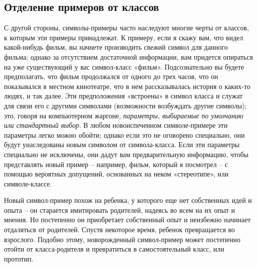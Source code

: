 \documentclass[../main.tex]{subfiles}
\begin{document}
\subsection{Отделение примеров от классов}

С другой стороны, символы-примеры часто наследуют многие черты от классов, к которым эти примеры принадлежат. К примеру, если я скажу вам, что видел какой-нибудь фильм, вы начнете производить свежий символ для данного фильма; однако за отсутствием достаточной информации, вам придется опираться на уже существующий у вас символ-класс «фильм». Подсознательно вы будете предполагать, что фильм продолжался от одного до трех часов, что он показывался в местном кинотеатре, что в нем рассказывалась история о каких-то людях, и так далее. Эти предположения «встроены» в символ класса и служат для связи его с другими символами (возможности возбуждать другие символы); это, говоря на компьютерном жаргоне, \emph{параметры, выбираемые по умолчанию или стандартный выбор}. В любом новоиспеченном символе-примере эти параметры легко можно обойти; однако если это не оговорено специально, они будут унаследованы новым символом от символа-класса. Если эти параметры специально не исключены, они дадут вам предварительную информацию, чтобы представлять новый пример \--- например, фильм, который я посмотрел \--- с помощью вероятных допущений, основанных на неком «стереотипе», или символе-классе.

Новый символ-пример похож на ребенка, у которого еще нет собственных идей и опыта \--- он старается имитировать родителей, надеясь во всем на их опыт и мнения. Но постепенно он приобретает собственный опыт и неизбежно начинает отдаляться от родителей. Спустя некоторое время, ребенок превращается во взрослого. Подобно этому, новорожденный символ-пример может постепенно отойти от класса-родителя и превратиться в самостоятельный класс, или прототип.
\end{document}
